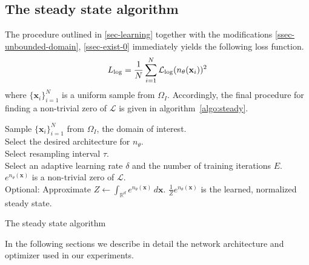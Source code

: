 \subsection{The steady state algorithm}
The procedure outlined in \ref{sec-learning} together with the modifications \ref{ssec-unbounded-domain}, \ref{ssec-exist-0} immediately yields the following  loss function.
\begin{align}
    L_{\log}=\frac{1}{N}\sum_{i=1}^N\mathcal L_{\rm log}(n_\theta(\mathbf x_i))^2\label{eq:def-steady-loss}
\end{align}
where $\{\mathbf x_i\}_{i=1}^N$ is a uniform sample from $\Omega_I$. Accordingly, the final procedure for finding a non-trivial zero of $\mathcal L$ is given in algorithm~\ref{algo:steady}.
\begin{algorithm}[!ht]
Sample $\{\mathbf x_i\}_{i=1}^N$ from $\Omega_I$, the domain of interest.\\
Select the desired architecture for $n_\theta$.\\
Select resampling interval $\tau$.\\
Select an adaptive learning rate $\delta$ and the number of training iterations $E$.\\
$e^{n_\theta(\mathbf x)}$ is a non-trivial zero of $\mathcal{L}$.\\
Optional: Approximate $Z\leftarrow\int_{\mathbb R^d}e^{n_\theta(\mathbf x)}\,d\mathbf x$.
$\frac{1}{Z}e^{n_\theta(\mathbf x)}$ is the learned, normalized steady state.
\caption{The steady state algorithm}\label{algo:steady}
\end{algorithm}
In the following sections we describe in detail the network architecture and optimizer used in our experiments. 

